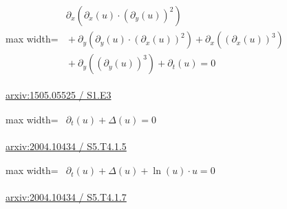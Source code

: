 \documentclass[UTF8,10pt,a4paper,fontset=mac]{ctexart}
\begin{document}
\begin{minipage}{\linewidth}\begin{center}\begin{adjustbox}{max width=\linewidth}$\displaystyle\begin{gathered}\begin{gathered}\partial_{x}(\partial_{x}(u)\cdot (\partial_{y}(u))^{2})\\[-1pt]{}+\partial_{y}(\partial_{y}(u)\cdot (\partial_{x}(u))^{2})+\partial_{x}((\partial_{x}(u))^{3})\\[-1pt]{}+\partial_{y}((\partial_{y}(u))^{3})+\partial_{t}(u)=0\end{gathered}\end{gathered}$\end{adjustbox}\end{center}{\small\href{https://arxiv.org/html/1505.05525#S1.E3}{arxiv:1505.05525 / S1.E3}}\par\end{minipage}\par\vspace{6mm}

\begin{minipage}{\linewidth}\begin{center}\begin{adjustbox}{max width=\linewidth}$\displaystyle\begin{gathered}\begin{gathered}\partial_{t}(u)+\Delta(u)=0\end{gathered}\end{gathered}$\end{adjustbox}\end{center}{\small\href{https://arxiv.org/html/2004.10434#S5.T4.1.5}{arxiv:2004.10434 / S5.T4.1.5}}\par\end{minipage}\par\vspace{6mm}

\begin{minipage}{\linewidth}\begin{center}\begin{adjustbox}{max width=\linewidth}$\displaystyle\begin{gathered}\begin{gathered}\partial_{t}(u)+\Delta(u)+\ln(u)\cdot u=0\end{gathered}\end{gathered}$\end{adjustbox}\end{center}{\small\href{https://arxiv.org/html/2004.10434#S5.T4.1.7}{arxiv:2004.10434 / S5.T4.1.7}}\par\end{minipage}\par\vspace{6mm}
\end{document}
